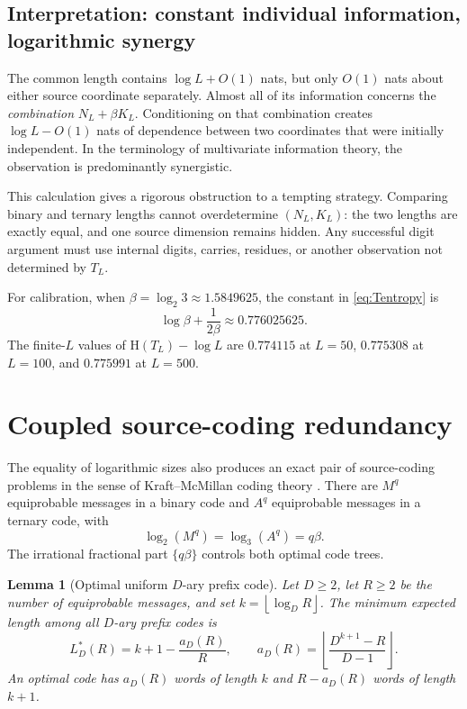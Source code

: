 \documentclass[11pt,oneside]{article}
\newtheorem{lemma}[theorem]{Lemma}
\theoremstyle{definition}
\theoremstyle{remark}
\newcommand{\HH}{\mathrm{H}}
\newcommand{\floor}[1]{\left\lfloor #1\right\rfloor}
\begin{document}
\subsection{Interpretation: constant individual information, logarithmic synergy}

The common length contains $\log L+O(1)$ nats, but only $O(1)$ nats about either source coordinate separately.  Almost all of its information concerns the \emph{combination} $N_L+\beta K_L$.  Conditioning on that combination creates $\log L-O(1)$ nats of dependence between two coordinates that were initially independent.  In the terminology of multivariate information theory, the observation is predominantly synergistic.

This calculation gives a rigorous obstruction to a tempting strategy.  Comparing binary and ternary lengths cannot overdetermine $(N_L,K_L)$: the two lengths are exactly equal, and one source dimension remains hidden.  Any successful digit argument must use internal digits, carries, residues, or another observation not determined by $T_L$.

For calibration, when $\beta=\log_2 3\approx1.5849625$, the constant in \eqref{eq:Tentropy} is
\[
 \log\beta+\frac1{2\beta}\approx0.776025625.
\]
The finite-$L$ values of $\HH(T_L)-\log L$ are $0.774115$ at $L=50$, $0.775308$ at $L=100$, and $0.775991$ at $L=500$.

\section{Coupled source-coding redundancy}\label{sec:prefix}

The equality of logarithmic sizes also produces an exact pair of source-coding problems in the sense of Kraft--McMillan coding theory \cite{Shannon1948,CoverThomas2006}.  There are $M^q$ equiprobable messages in a binary code and $A^q$ equiprobable messages in a ternary code, with
\[
 \log_2(M^q)=\log_3(A^q)=q\beta.
\]
The irrational fractional part $\{q\beta\}$ controls both optimal code trees.

\begin{lemma}[Optimal uniform $D$-ary prefix code]\label{lem:uniform-code}
Let $D\geq2$, let $R\geq2$ be the number of equiprobable messages, and set $k=\floor{\log_D R}$.  The minimum expected length among all $D$-ary prefix codes is
\begin{equation}\label{eq:optimal-length}
  L_D^*(R)=k+1-\frac{a_D(R)}{R},
  \qquad
  a_D(R)=\floor{\frac{D^{k+1}-R}{D-1}}.
\end{equation}
An optimal code has $a_D(R)$ words of length $k$ and $R-a_D(R)$ words of length $k+1$.
\end{lemma}
\end{document}
